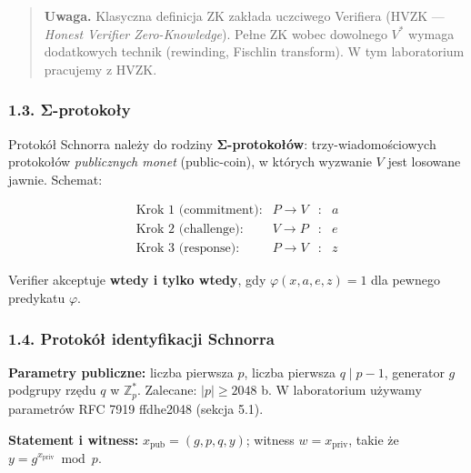 \documentclass[
]{article}
\begin{document}
\begin{quote}
\textbf{Uwaga.} Klasyczna definicja ZK zakłada uczciwego Verifiera (HVZK
--- \emph{Honest Verifier Zero-Knowledge}). Pełne ZK wobec dowolnego
\(V^*\) wymaga dodatkowych technik (rewinding, Fischlin transform). W
tym laboratorium pracujemy z HVZK.
\end{quote}

\subsubsection{1.3. Σ-protokoły}\label{ux3c3-protokoux142y}

Protokół Schnorra należy do rodziny \textbf{Σ-protokołów}:
trzy-wiadomościowych protokołów \emph{publicznych monet} (public-coin),
w których wyzwanie \(V\) jest losowane jawnie. Schemat:

\[
\begin{array}{lrcl}
\text{Krok 1 (commitment):} & P \to V & : & a \\
\text{Krok 2 (challenge):}  & V \to P & : & e \\
\text{Krok 3 (response):}   & P \to V & : & z
\end{array}
\]

Verifier akceptuje \textbf{wtedy i tylko wtedy}, gdy
\(\varphi(x, a, e, z) = 1\) dla pewnego predykatu \(\varphi\).

\subsubsection{1.4. Protokół identyfikacji
Schnorra}\label{protokuxf3ux142-identyfikacji-schnorra}

\textbf{Parametry publiczne:} liczba pierwsza \(p\), liczba pierwsza
\(q \mid p-1\), generator \(g\) podgrupy rzędu \(q\) w
\(\mathbb{Z}^*_p\). Zalecane: \(|p| \geq 2048\) b. W laboratorium
używamy parametrów RFC 7919 ffdhe2048 (sekcja 5.1).

\textbf{Statement i witness:} \(x_{\mathrm{pub}} = (g, p, q, y)\);
witness \(w = x_{\mathrm{priv}}\), takie że
\(y = g^{x_{\mathrm{priv}}} \bmod p\).
\end{document}
